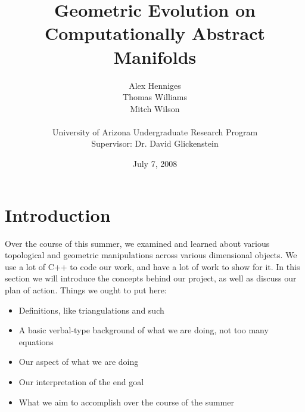 \documentclass[12pt]{article}
\title{Geometric Evolution on Computationally Abstract Manifolds}
\author{Alex Henniges \\ Thomas Williams \\ Mitch Wilson \\ \\ University of Arizona Undergraduate Research Program\\
Supervisor: Dr. David Glickenstein\\
}
\date{July 7, 2008}
\begin{document}
	\maketitle
  \newpage
  \section{Introduction}
  \maketitle
  Over the course of this summer, we examined and learned about various topological and geometric manipulations across various dimensional objects. We use a lot of C++ to code our work, and have a lot of work to show for it. In this section we will introduce the concepts behind our project, as well as discuss our plan of action. 
  Things we ought to put here:
  \begin{itemize}
  \item Definitions, like triangulations and such
  \item A basic verbal-type background of what we are doing, not too many equations
  \item Our aspect of what we are doing
  \item Our interpretation of the end goal
  \item What we aim to accomplish over the course of the summer
  \end{itemize}
  
\end{document}
